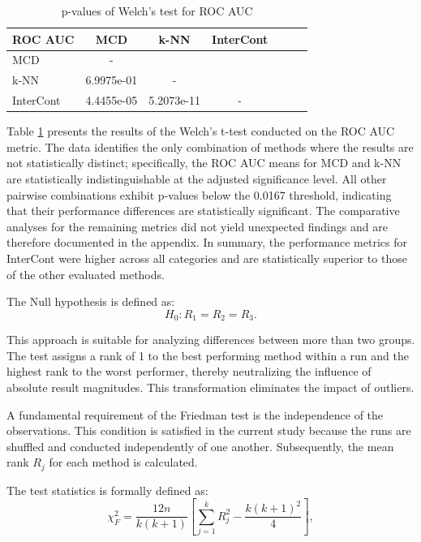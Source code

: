 \begin{table}[h]
\centering
\caption{p-values of Welch's test for ROC AUC}
\label{tab:Welch1}
\begin{tabular}{lcccccc} 
\toprule
\textbf{ROC AUC}    & MCD       & k-NN      & InterCont  &    \\
\midrule
MCD                 & -             &               &    &     \\
k-NN                & 6.9975e-01    & -             &    &     \\
InterCont           & 4.4455e-05    & 5.2073e-11    & -  &     \\
\bottomrule
\end{tabular}
\end{table}


Table \ref{tab:Welch1} presents the results of the Welch's t-test conducted on the ROC AUC metric. 
The data identifies the only combination of methods where the results are not statistically distinct; specifically, the ROC AUC means for MCD and k-NN are statistically indistinguishable at the adjusted significance level. 
All other pairwise combinations exhibit p-values below the 0.0167 threshold, indicating that their performance differences are statistically significant. 
The comparative analyses for the remaining metrics did not yield unexpected findings and are therefore documented in the appendix. 
In summary, the performance metrics for InterCont were higher across all categories and are statistically superior to those of the other evaluated methods.





The Null hypothesis is defined as: 
\begin{equation}
    H_0 : R_1 = R_2 = R_3.
\end{equation}

This approach is suitable for analyzing differences between more than two groups. 
The test assigns a rank of 1 to the best performing method within a run and the highest rank to the worst performer, thereby neutralizing the influence of absolute result magnitudes. 
This transformation eliminates the impact of outliers. 


A fundamental requirement of the Friedman test is the independence of the observations. 
This condition is satisfied in the current study because the runs are shuffled and conducted independently of one another. 
Subsequently, the mean rank $R_j$ for each method is calculated.


The test statistics is formally defined as:
\begin{equation}
    \chi_F^2 = \frac{12n}{k(k+1)} \left[ \sum_{j=1}^{k} R_j^2 - \frac{k(k+1)^2}{4} \right],
\end{equation}

